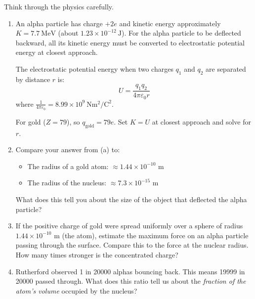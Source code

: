 \documentclass[12pt, a4paper]{book}
\theoremstyle{definition}
\begin{document}
\begin{puzzlebox}
Think through the physics carefully.

\begin{enumerate}[label=(\alph*), leftmargin=*]
  \item An alpha particle has charge $+2e$ and kinetic energy
        approximately $K = \SI{7.7}{\mega\electronvolt}$
        (about $1.23\times10^{-12}\ \si{\joule}$).
        For the alpha particle to be deflected backward,
        all its kinetic energy must be converted to
        electrostatic potential energy at closest approach.

        The electrostatic potential energy when two charges
        $q_1$ and $q_2$ are separated by distance $r$ is:
        \[
          U = \frac{q_1 q_2}{4\pi\varepsilon_0 r}
        \]
        where $\frac{1}{4\pi\varepsilon_0} = 8.99\times10^9\ \si{\newton\metre\squared\per\coulomb\squared}$.

        For gold ($Z = 79$), so $q_{\text{gold}} = 79e$.
        Set $K = U$ at closest approach and solve for $r$.

  \item Compare your answer from (a) to:
        \begin{itemize}[nosep]
          \item The radius of a gold atom: $\approx 1.44\times10^{-10}$ m
          \item The radius of the nucleus: $\approx 7.3\times10^{-15}$ m
        \end{itemize}
        What does this tell you about the size of the object
        that deflected the alpha particle?

  \item If the positive charge of gold were spread uniformly
        over a sphere of radius $1.44\times10^{-10}$ m (the atom),
        estimate the maximum force on an alpha particle
        passing through the surface.
        Compare this to the force at the nuclear radius.
        How many times stronger is the concentrated charge?

  \item Rutherford observed 1 in 20000 alphas bouncing back.
        This means 19999 in 20000 passed through.
        What does this ratio tell us about the
        \emph{fraction of the atom's volume} occupied
        by the nucleus?
\end{enumerate}
\end{puzzlebox}

\end{document}
